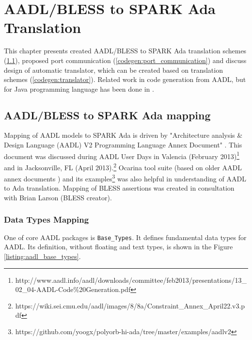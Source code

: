 
\cleardoublepage


\chapter{AADL/BLESS to SPARK Ada Translation}
\label{codegen}

This chapter presents created AADL/BLESS to SPARK Ada translation schemes (\ref{codegen:mapping}), proposed port communication (\ref{codegen:port_communication}) and discuss design of automatic translator, which can be created based on translation schemes (\ref{codegen:translator}). Related work in code generation from AADL, but for Java programming language has been done in \cite{MAP:Paper}. 



\section{AADL/BLESS to SPARK Ada mapping}
\label{codegen:mapping}


Mapping of AADL models to SPARK Ada is driven by "Architecture analysis \& Design Language (AADL) V2 Programming Language Annex Document" \cite{AnnexDoc}. This document was discussed during AADL User Days in Valencia (February 2013)\footnote{http://www.aadl.info/aadl/downloads/committee/feb2013/presentations/13\_02\_04-AADL-Code\%20Generation.pdf} and in Jacksonville, FL (April 2013).\footnote{https://wiki.sei.cmu.edu/aadl/images/8/8a/Constraint\_Annex\_April22.v3.pdf} Ocarina tool suite (based on older AADL annex documents \cite{Ocarina:Article}) and its examples\footnote{https://github.com/yoogx/polyorb-hi-ada/tree/master/examples/aadlv2} was also helpful in understanding of AADL to Ada translation. Mapping of BLESS assertions was created in consultation with Brian Larson (BLESS creator).
 


\subsection{Data Types Mapping}
\label{codegen:mapping:data}

One of core AADL packages is \lstinline{Base_Types}. It defines fundamental data types for AADL. Its definition, without floating and text types, is shown in the Figure \ref{listing:aadl_base_types}.

